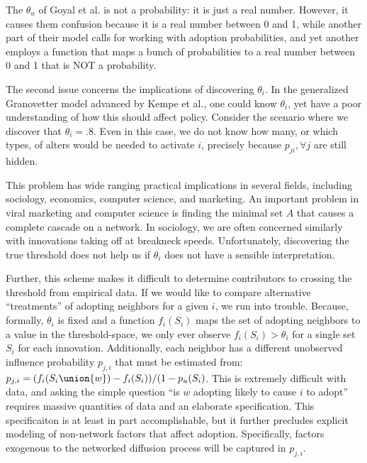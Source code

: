 \documentclass{article}
\begin{document}
The $\theta_u$ of Goyal et al. is not a probability: it is just a real number. However, it causes them confusion because it is a real number between 0 and 1, while another part of their model calls for working with adoption probabilities, and yet another employs a function that maps a bunch of probabilities to a real number between 0 and 1 that is NOT a probability.

The second issue concerns the implications of discovering $\theta_i$. In the generalized Granovetter model advanced by Kempe et al., one could know $\theta_i$, yet have a poor understanding of how this should affect policy. Consider the scenario where we discover that $\theta_i = .8$. Even in this case, we do not know how many, or which types, of alters would be needed to activate $i$, precisely because $p_{ji}, \forall j$ are still hidden.

This problem has wide ranging practical implications in several fields, including sociology, economics, computer science, and marketing. An important problem in viral marketing and computer science is finding the minimal set $A$ that causes a complete cascade on a network. In sociology, we are often concerned similarly with innovations taking off at breakneck speeds. Unfortunately, discovering the true threshold does not help us if $\theta_i$ does not have a sensible interpretation.

Further, this scheme makes it difficult to determine contributors to crossing the threshold from empirical data. If we would like to compare alternative ``treatments'' of adopting neighbors for a given $i$, we run into trouble. Because, formally, $\theta_i$ is fixed and a function $f_i(S_i)$ maps the set of adopting neighbors to a value in the threshold-space, we only ever observe $f_i(S_i) > \theta_i$ for a single set $S_i$ for each innovation. Additionally, each neighbor has a different unobserved influence probability $p_{j,i}$ that must be estimated from: $p_{j,i} = (f_i(S_i \union {w}) - f_i(S_i))/(1-p_u(S_i)$. This is extremely difficult with data, and asking the simple question ``is $w$ adopting likely to cause $i$ to adopt'' requires massive quantities of data and an elaborate specification. This specificaiton is at least in part accomplishable, but it further precludes explicit modeling of non-network factors that affect adoption. Specifically, factors exogenous to the networked diffusion process will be captured in $p_{j,i}$.
\end{document}
